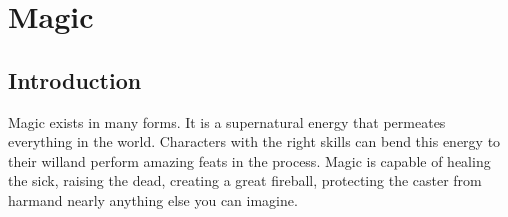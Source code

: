 \documentclass[twoside]{book}
\begin{document}
\begin{multicols}{2}
    \hspace{-2ex}


\vspace{1ex}


    \hspace{-2ex}


\vspace{1ex}


    \hspace{-2ex}


\vspace{1ex}


    \hspace{-2ex}


\vspace{1ex}


    \hspace{-2ex}


\vspace{1ex}


    \hspace{-2ex}


\vspace{1ex}


    \hspace{-2ex}


\vspace{1ex}


    \hspace{-2ex}


\vspace{1ex}


    
\end{multicols}
  
    

\chapter{Magic}
    
    

\section{Introduction}
    
    {  
      Magic exists in many forms. It is a supernatural
             energy that permeates everything in the world. Characters
             with the right skills can bend this energy to their
             willand perform amazing feats in the process. Magic
             is capable of healing the sick, raising the dead, creating a
             great fireball, protecting the caster from harmand
             nearly anything else you can imagine. 
    }
  
\end{document}
